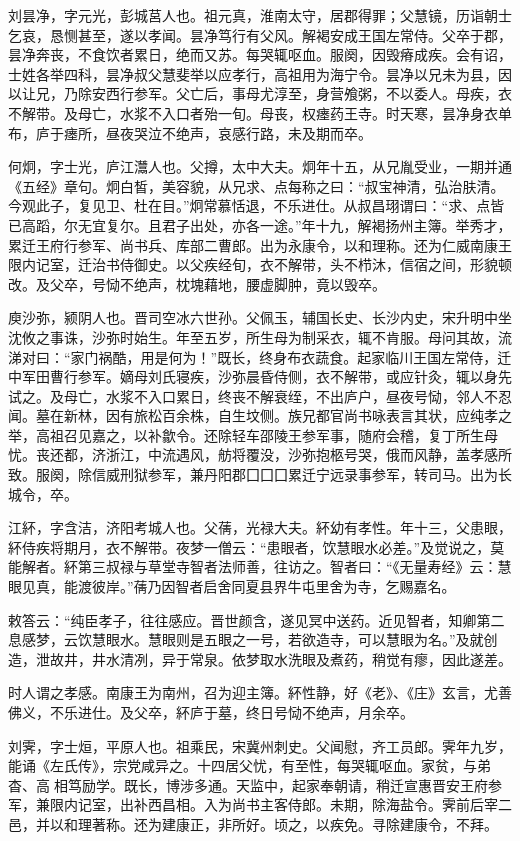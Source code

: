 \documentclass[12pt,UTF8]{ctexbook}
\begin{document}
刘昙净，字元光，彭城莒人也。祖元真，淮南太守，居郡得罪；父慧镜，历诣朝士乞哀，恳恻甚至，遂以孝闻。昙净笃行有父风。解褐安成王国左常侍。父卒于郡，昙净奔丧，不食饮者累日，绝而又苏。每哭辄呕血。服阕，因毁瘠成疾。会有诏，士姓各举四科，昙净叔父慧斐举以应孝行，高祖用为海宁令。昙净以兄未为县，因以让兄，乃除安西行参军。父亡后，事母尤淳至，身营飧粥，不以委人。母疾，衣不解带。及母亡，水浆不入口者殆一旬。母丧，权瘗药王寺。时天寒，昙净身衣单布，庐于瘗所，昼夜哭泣不绝声，哀感行路，未及期而卒。

何炯，字士光，庐江灊人也。父撙，太中大夫。炯年十五，从兄胤受业，一期并通《五经》章句。炯白皙，美容貌，从兄求、点每称之曰：“叔宝神清，弘治肤清。今观此子，复见卫、杜在目。”炯常慕恬退，不乐进仕。从叔昌珝谓曰：“求、点皆已高蹈，尔无宜复尔。且君子出处，亦各一途。”年十九，解褐扬州主簿。举秀才，累迁王府行参军、尚书兵、库部二曹郎。出为永康令，以和理称。还为仁威南康王限内记室，迁治书侍御史。以父疾经旬，衣不解带，头不栉沐，信宿之间，形貌顿改。及父卒，号恸不绝声，枕塊藉地，腰虚脚肿，竟以毁卒。

庾沙弥，颍阴人也。晋司空冰六世孙。父佩玉，辅国长史、长沙内史，宋升明中坐沈攸之事诛，沙弥时始生。年至五岁，所生母为制采衣，辄不肯服。母问其故，流涕对曰：“家门祸酷，用是何为！”既长，终身布衣蔬食。起家临川王国左常侍，迁中军田曹行参军。嫡母刘氏寝疾，沙弥晨昏侍侧，衣不解带，或应针灸，辄以身先试之。及母亡，水浆不入口累日，终丧不解衰绖，不出庐户，昼夜号恸，邻人不忍闻。墓在新林，因有旅松百余株，自生坟侧。族兄都官尚书咏表言其状，应纯孝之举，高祖召见嘉之，以补歙令。还除轻车邵陵王参军事，随府会稽，复丁所生母忧。丧还都，济浙江，中流遇风，舫将覆没，沙弥抱柩号哭，俄而风静，盖孝感所致。服阕，除信威刑狱参军，兼丹阳郡囗囗囗累迁宁远录事参军，转司马。出为长城令，卒。

江紑，字含洁，济阳考城人也。父蒨，光禄大夫。紑幼有孝性。年十三，父患眼，紑侍疾将期月，衣不解带。夜梦一僧云：“患眼者，饮慧眼水必差。”及觉说之，莫能解者。紑第三叔禄与草堂寺智者法师善，往访之。智者曰：“《无量寿经》云：慧眼见真，能渡彼岸。”蒨乃因智者启舍同夏县界牛屯里舍为寺，乞赐嘉名。

敕答云：“纯臣孝子，往往感应。晋世颜含，遂见冥中送药。近见智者，知卿第二息感梦，云饮慧眼水。慧眼则是五眼之一号，若欲造寺，可以慧眼为名。”及就创造，泄故井，井水清冽，异于常泉。依梦取水洗眼及煮药，稍觉有瘳，因此遂差。

时人谓之孝感。南康王为南州，召为迎主簿。紑性静，好《老》、《庄》玄言，尤善佛义，不乐进仕。及父卒，紑庐于墓，终日号恸不绝声，月余卒。

刘霁，字士烜，平原人也。祖乘民，宋冀州刺史。父闻慰，齐工员郎。霁年九岁，能诵《左氏传》，宗党咸异之。十四居父忧，有至性，每哭辄呕血。家贫，与弟杳、高相笃励学。既长，博涉多通。天监中，起家奉朝请，稍迁宣惠晋安王府参军，兼限内记室，出补西昌相。入为尚书主客侍郎。未期，除海盐令。霁前后宰二邑，并以和理著称。还为建康正，非所好。顷之，以疾免。寻除建康令，不拜。
\end{document}
